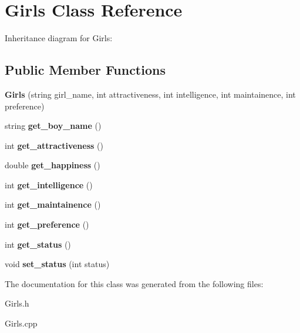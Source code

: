 \hypertarget{classGirls}{}\section{Girls Class Reference}
\label{classGirls}


Inheritance diagram for Girls\+:
\subsection*{Public Member Functions}
\begin{DoxyCompactItemize}
\item 
{\bfseries Girls} (string girl\+\_\+name, int attractiveness, int intelligence, int maintainence, int preference)\hypertarget{classGirls_a9c4bf22be7d0ee8537841a0b122cbd58}{}\label{classGirls_a9c4bf22be7d0ee8537841a0b122cbd58}

\item 
string {\bfseries get\+\_\+boy\+\_\+name} ()\hypertarget{classGirls_a9c1f8d2351fd1077395808139ca6dd96}{}\label{classGirls_a9c1f8d2351fd1077395808139ca6dd96}

\item 
int {\bfseries get\+\_\+attractiveness} ()\hypertarget{classGirls_ab881a2d10020af2aadd0bb5eddbfcb35}{}\label{classGirls_ab881a2d10020af2aadd0bb5eddbfcb35}

\item 
double {\bfseries get\+\_\+happiness} ()\hypertarget{classGirls_a49548ddb0b97b38bb04735f7fef3b0bc}{}\label{classGirls_a49548ddb0b97b38bb04735f7fef3b0bc}

\item 
int {\bfseries get\+\_\+intelligence} ()\hypertarget{classGirls_a0ed65c8cee48e42f981683e861dc20e9}{}\label{classGirls_a0ed65c8cee48e42f981683e861dc20e9}

\item 
int {\bfseries get\+\_\+maintainence} ()\hypertarget{classGirls_a25b5c4f063d2142eefc7a06d1380160d}{}\label{classGirls_a25b5c4f063d2142eefc7a06d1380160d}

\item 
int {\bfseries get\+\_\+preference} ()\hypertarget{classGirls_a857209d52ad1c98b01774c9418466304}{}\label{classGirls_a857209d52ad1c98b01774c9418466304}

\item 
int {\bfseries get\+\_\+status} ()\hypertarget{classGirls_a409a2a932143275a6394e06323bc8577}{}\label{classGirls_a409a2a932143275a6394e06323bc8577}

\item 
void {\bfseries set\+\_\+status} (int status)\hypertarget{classGirls_ad14449b9ec3a8dc60890d821f8312dcb}{}\label{classGirls_ad14449b9ec3a8dc60890d821f8312dcb}

\end{DoxyCompactItemize}


The documentation for this class was generated from the following files\+:\begin{DoxyCompactItemize}
\item 
Girls.\+h\item 
Girls.\+cpp\end{DoxyCompactItemize}
